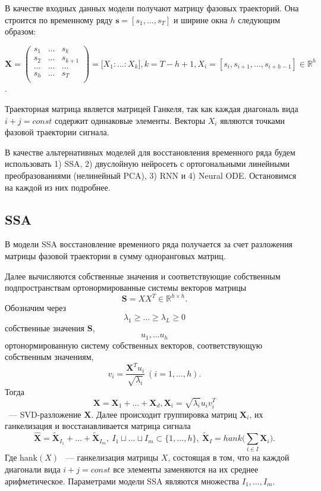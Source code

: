 \documentclass[12pt, twoside]{article}
\begin{document}
В качестве входных данных модели получают матрицу фазовых траекторий. Она строится по временному ряду $\mathbf{s} = [s_1, \dots, s_{T}]$ и ширине окна $h$ следующим образом:

$\mathbf{X} = \begin{pmatrix}
s_1 & \dots & s_{k}\\
s_2 & \dots & s_{k+1}\\
\dots & \dots & \dots\\
s_{h} & \dots & s_{T}\\
\end{pmatrix} = \big[X_1 : \dots : X_k\big], k=T-h+1, X_i = [s_i, s_{i+1}, \dots, s_{i + h - 1}] \in \mathbb{R}^h$. 

Траекторная матрица является матрицей Ганкеля, так как каждая диагональ вида $i+j=const$ содержит одинаковые элементы. Векторы $X_i$ являются точками фазовой траектории сигнала. 

В качестве альтернативных моделей для восстановления временного ряда будем использовать 1) SSA, 2) двуслойную нейросеть с ортогональными линейными преобразованиями (нелинейный PCA), 3) RNN и 4) Neural ODE. Остановимся на каждой из них подробнее.

\subsection{SSA}

В модели SSA восстановление временного ряда получается за счет разложения матрицы фазовой траектории в сумму одноранговых матриц. 

Далее вычисляются собственные значения и соответствующие собственным подпространствам ортонормированные системы векторов матрицы \[\mathbf{S}=XX^T \in \mathbb{R}^{h \times h}.\] Обозначим через \[\lambda_1 \ge \dots \ge \lambda_L \ge 0\] собственные значения $\mathbf{S}$, \[u_1, \dots u_h\] ортонормированную систему собственных векторов, соответствующую собственным значениям, \[v_i = \frac{\mathbf{X}^Tu_i}{\sqrt{\lambda_i}} \ (i=1, \dots, h).\] Тогда \[\mathbf{X} = \mathbf{X}_1 + \dots + \mathbf{X}_d, \mathbf{X}_i = \sqrt{\lambda_i}u_iv_i^T\] ~--- SVD-разложение $\mathbf{X}$. Далее происходит группировка матриц $\mathbf{X}_i$, их ганкелизация и восстанавливается матрица сигнала \[\hat{\mathbf{X}} = \mathbf{\tilde{X}}_{I_1} + \dots + \mathbf{\tilde{X}}_{I_m}, \ I_1 \sqcup \dots \sqcup I_m \subset \{1, \dots, h\}, \ \mathbf{\tilde{X}}_{I} = hank\big(\sum\limits_{i \in I}\mathbf{X}_i\big).\] Где $\text{hank}(X)$ ~--- ганкелизация матрицы $X$, состоящая в том, что на каждой диагонали вида $i+j=const$ все элементы заменяются на их среднее арифметическое. Параметрами модели SSA являются множества $I_1, \dots, I_m$.
\end{document}
